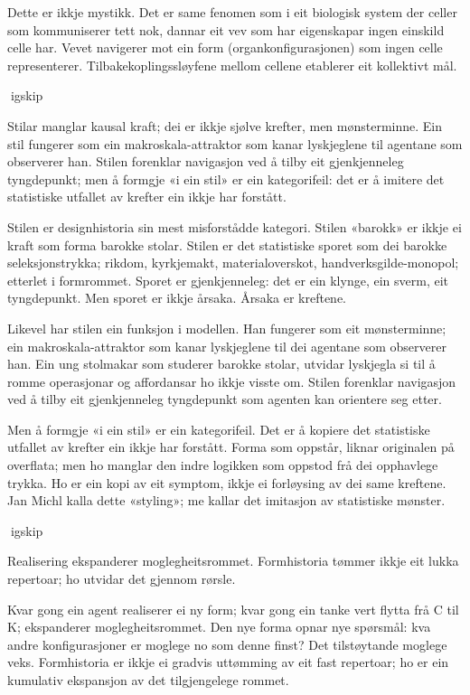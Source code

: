 Dette er ikkje mystikk. Det er same fenomen som i eit biologisk system der celler som kommuniserer tett nok, dannar eit vev som har eigenskapar ingen einskild celle har. Vevet navigerer mot ein form (organkonfigurasjonen) som ingen celle representerer. Tilbakekoplingssløyfene mellom cellene etablerer eit kollektivt mål.

igskip

Stilar manglar kausal kraft; dei er ikkje sjølve krefter, men mønsterminne. Ein stil fungerer som ein makroskala-attraktor som kanar lyskjeglene til agentane som observerer han. Stilen forenklar navigasjon ved å tilby eit gjenkjenneleg tyngdepunkt; men å formgje «i ein stil» er ein kategorifeil: det er å imitere det statistiske utfallet av krefter ein ikkje har forstått.

Stilen er designhistoria sin mest misforstådde kategori. Stilen «barokk» er ikkje ei kraft som forma barokke stolar. Stilen er det statistiske sporet som dei barokke seleksjonstrykka; rikdom, kyrkjemakt, materialoverskot, handverksgilde-monopol; etterlet i formrommet. Sporet er gjenkjenneleg: det er ein klynge, ein sverm, eit tyngdepunkt. Men sporet er ikkje årsaka. Årsaka er kreftene.

Likevel har stilen ein funksjon i modellen. Han fungerer som eit mønsterminne; ein makroskala-attraktor som kanar lyskjeglene til dei agentane som observerer han. Ein ung stolmakar som studerer barokke stolar, utvidar lyskjegla si til å romme operasjonar og affordansar ho ikkje visste om. Stilen forenklar navigasjon ved å tilby eit gjenkjenneleg tyngdepunkt som agenten kan orientere seg etter.

Men å formgje «i ein stil» er ein kategorifeil. Det er å kopiere det statistiske utfallet av krefter ein ikkje har forstått. Forma som oppstår, liknar originalen på overflata; men ho manglar den indre logikken som oppstod frå dei opphavlege trykka. Ho er ein kopi av eit symptom, ikkje ei forløysing av dei same kreftene. Jan Michl kalla dette «styling»; me kallar det imitasjon av statistiske mønster.

igskip

Realisering ekspanderer moglegheitsrommet. Formhistoria tømmer ikkje eit lukka repertoar; ho utvidar det gjennom rørsle.

Kvar gong ein agent realiserer ei ny form; kvar gong ein tanke vert flytta frå C til K; ekspanderer moglegheitsrommet. Den nye forma opnar nye spørsmål: kva andre konfigurasjoner er moglege no som denne finst? Det tilstøytande moglege veks. Formhistoria er ikkje ei gradvis uttømming av eit fast repertoar; ho er ein kumulativ ekspansjon av det tilgjengelege rommet.

